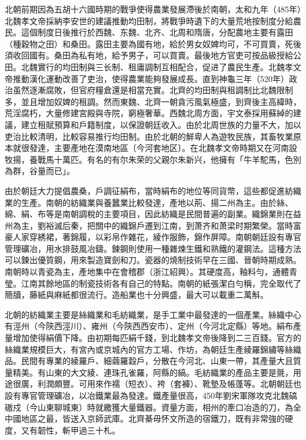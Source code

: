 北朝前期因為五胡十六國時期的戰爭使得農業發展滯後於南朝，太和九年（485年）北魏孝文帝採納李安世的建議推動均田制，將戰爭時遺下的大量荒地按制度分給農民。這個制度日後推行於西魏、东魏、北齐、北周和隋唐，分配農地主要有露田（種穀物之田）和桑田。露田主要為國有地，給於男女奴婢均可，不可買賣，死後須收回國有。桑田為私有地，給予男子，可以買賣。最後地方官吏可按品級授給公田。北魏實行的均田制與三长制、租庸調制互相配合，促进了農民生產。北魏孝文帝推動漢化運動改善了吏治，使得農業能夠發展成長。直到神龜三年（520年）政治虽然逐漸腐敗，但官府糧倉還是相當充實。北齊的均田制與租調制比北魏限制多，並且增加奴婢的租調。然而東魏、北齊一朝貪污風氣極盛，到齊後主高緯時，荒淫腐朽，大量修建宮殿與寺院，窮極奢華。西魏北周方面，宇文泰採用蘇綽的建議，建立租賦預算和戶籍制度，以保證朝廷收入。由於北周世族的力量不大，加以吏治比較清明，比較容易推行均田制。由於北朝的鮮卑人為遊牧民族，其畜牧業原本就很發達，主要產地在漠南地區〔今河套地区〕。在北魏孝文帝時期又在河南設牧揚，養戰馬十萬匹。有名的有尔朱荣的父親尔朱新兴，他擁有「牛羊駝馬，色別為群，谷量而已」。

由於朝廷大力提倡農桑，戶調征絹布，當時絹布的地位等同貨幣，這些都促進紡織業的生產。南朝的紡織業與養蠶業比較發達，產地以荊、揚二州為主。由於絲、綿、絹、布等是南朝調稅的主要項目，因此紡織是民間普遍的副業。織錦業則在益州為主，劉裕滅后秦，把關中的織錦戶遷到江南，到萧齐和萧梁时期繁榮。當時富豪人家穿綉裙，著錦履，以彩帛作雜花，綾作服飾，錦作屏障。南朝朝廷設有專官管理礦冶，用水排鼓風冶鑄。鍊鋼則使用一種雜煉生鐵和熟鐵的灌鋼法。這種方法可以鍊出優質鋼，用來製造寶劍和刀。瓷器的燒制技術早在三國、晉朝時期成熟。南朝時以青瓷為主，產地集中在會稽郡（浙江紹興）。其硬度高，釉料勻，通體青瑩。江南其餘地區的制瓷技術各有自己的特點。南朝的紙張潔白勻稱，完全取代了簡牘，藤紙與麻紙都很流行。造船業也十分興盛，最大可以載重二萬斛。

北朝的紡織業主要是絲織業和毛紡織業，是手工業中最發達的一個產業。絲織中心有涇州（今陝西涇川）、雍州（今陝西西安市）、定州（今河北定縣）等地。絹布產量增加使得絹價下降。由初期每匹絹千錢，到北魏孝文帝後降到二三百錢。官方的絲織業規模巨大，有宮內或京城內的官方工場、作坊，為朝廷生產綾羅錦繡等絲織品。民間有專業的綾羅戶、細繭羅縠戶，分散在今河北、山東一帶，其產量大且質量精美。有山東的大文綾、連珠孔雀羅，阿縣的縞。毛紡織業的產品主要是氈，用途很廣，利潤頗豐。可用來作襦（短衣）、袴（套褲）、靴墊及帳蓬等。北朝朝廷也設有專官管理礦冶，以冶鐵業最為發達。鐵產量很高，450年劉宋軍隊攻克北魏碻磝戍（今山東聊城東）時就繳獲大量鐵器。資量方面，相州的牽口冶造的刀，為全中國地區之最，皆送入京師武庫。北齊綦毋怀文所造的宿鐵刀，既有非常強的硬度，又有韌性，斬甲過三十札。


